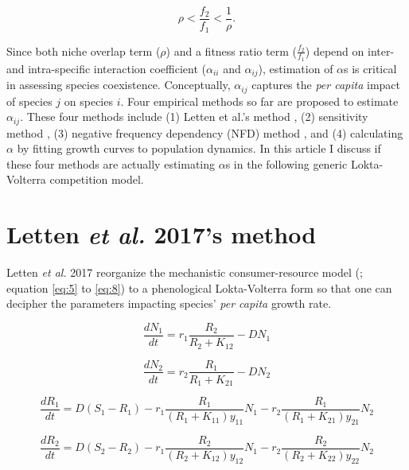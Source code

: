 \documentclass[fleqn]{article}
\begin{document}
\begin{equation}\label{eq:4}
 \rho < \frac{f_2}{f_1} < \frac{1}{\rho}.
\end{equation}

Since both niche overlap term ($\rho$) and a fitness ratio term ($\frac{f_2}{f_1}$) depend on inter- and intra-specific interaction coefficient ($\alpha_{ii}$ and $\alpha_{ij}$), estimation of $\alpha$s is critical in assessing species coexistence. Conceptually, $\alpha_{ij}$ captures the \textit{per capita} impact of species $j$ on species $i$. Four empirical methods so far are proposed to estimate $\alpha_{ij}$. These four methods include (1) Letten et al.'s method \cite{Letten2017}, (2) sensitivity method \cite{Carroll2011, Narwani2013}, (3) negative frequency dependency (NFD) method \cite{Levine2009, Hillerislambers2012}, and (4) calculating $\alpha$ by fitting growth curves to population dynamics. In this article I discuss if these four methods are actually estimating $\alpha$s in the following generic Lokta-Volterra competition model. 

\newpage
\section{Letten \textit{et al.} 2017's method}

Letten \textit{et al.} 2017 reorganize the mechanistic consumer-resource model (\cite{Tilman1977}; equation \ref{eq:5} to \ref{eq:8}) to a phenological Lokta-Volterra form so that one can decipher the parameters impacting species' \textit{per capita} growth rate. 

\begin{equation}\label{eq:5}
 \frac{dN_1}{dt} = r_1\frac{R_2}{R_2+K_{12}} - DN_1
\end{equation}

\begin{equation}\label{eq:6}
 \frac{dN_2}{dt} = r_2\frac{R_1}{R_1+K_{21}} - DN_2
\end{equation}

\begin{equation}\label{eq:7}
 \frac{dR_1}{dt} = D(S_1 - R_1) - r_1\frac{R_1}{(R_1 + K_{11})y_11}N_1 - r_2\frac{R_1}{(R_1 + K_{21})y_21}N_2
\end{equation}

\begin{equation}\label{eq:8}
 \frac{dR_2}{dt} = D(S_2 - R_2) - r_1\frac{R_2}{(R_2 + K_{12})y_12}N_1 - r_2\frac{R_2}{(R_2 + K_{22})y_22}N_2
\end{equation}
\end{document}
